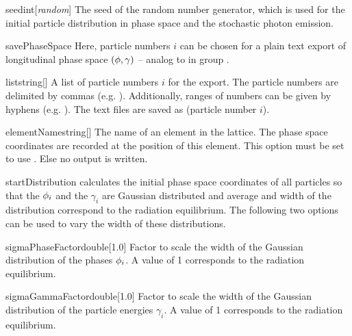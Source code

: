 \documentclass[a4paper]{scrartcl}
\begin{document}
\begin{configdoc}{seed}{int}{}[\textit{random}]
  The seed of the random number generator, which is used for the initial particle
  distribution in phase space and the stochastic photon emission.
\end{configdoc}

\begin{configdocgroup}{savePhaseSpace}
  Here, particle numbers $i$ can be chosen for a plain text export of longitudinal phase
  space $(\phi,\gamma)$ -- analog to  in group
  .

  \begin{configdoc}{list}{string}{}[]
    A list of particle numbers $i$ for the export. The particle numbers are delimited by
    commas (e.g. ). Additionally, ranges of numbers can be given by
    hyphens (e.g. ). The text files are saved as
     (particle number $i$).
  \end{configdoc}

  \begin{configdoc}{elementName}{string}{}[]
    The name of an element in the lattice. The phase space coordinates are recorded at the
    position of this element. This option must be set to use .
    Else no output is written.
  \end{configdoc}
\end{configdocgroup}

\begin{configdocgroup}{startDistribution}
  \polem calculates the initial phase space coordinates of all particles so that the
  $\phi_i$ and the $\gamma_i$ are Gaussian distributed and average and width of the
  distribution correspond to the radiation equilibrium. The following two options can be
  used to vary the width  of these distributions.

  \begin{configdoc}{sigmaPhaseFactor}{double}{}[1.0]
    Factor to scale the width of the Gaussian distribution of the phases $\phi_i$. A value
    of 1 corresponds to the radiation equilibrium.
  \end{configdoc}

  \begin{configdoc}{sigmaGammaFactor}{double}{}[1.0]
    Factor to scale the width of the Gaussian distribution of the particle energies
    $\gamma_i$. A value of 1 corresponds to the radiation equilibrium.
  \end{configdoc}
\end{configdocgroup}
\end{document}
